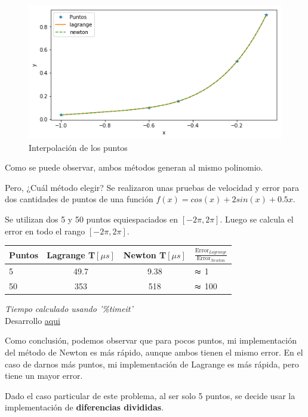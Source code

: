 \documentclass[spanish, fleqn]{article}
\begin{document}
\begin{enumerate}
   \begin{figure}[h]
    \caption{Interpolación de los puntos}
    \centering 
 	\includegraphics[scale=0.6]{interpolacion1.png}
   \end{figure}
  
	Como se puede observar, ambos métodos generan al mismo polinomio.
	
	Pero, ¿Cuál método elegir?
	Se realizaron unas pruebas de velocidad y error para dos cantidades de puntos de una función $f(x) = cos(x) + 2 sin(x) + 0.5x$.
	
	Se utilizan dos 5 y 50 puntos equiespaciados en $[-2\pi, 2\pi]$. Luego se calcula el error en todo el rango $[-2\pi, 2\pi]$.
		\begin{center}
	\begin{tabular}{|l|c|c|l|}
	\hline
	Puntos & Lagrange T$[\mu s]$& Newton T$[\mu s]$& $\frac{\text{Error}_{Lagrange}}{\text{Error}_{Newton}}$\\
	\hline
	5	& 49.7 & 9.38 & $\thickapprox$ 1\\
	\hline
	50 & 353 & 518 & $\thickapprox$ 100\\
	\hline
	\end{tabular}
	

	\small{\textit{Tiempo calculado usando '\%timeit'}\\ Desarrollo \href{https://github.com/sborquez/INF-221-2018-1-/blob/master/Tarea1/codigos/tarea1Sandbox.ipynb}{aqui}}
	\end{center}
  
  
  Como conclusión, podemos observar que para pocos puntos, mi implementación del método de Newton es más rápido, aunque ambos tienen el mismo error. En el caso de darnos más puntos, mi implementación de Lagrange es más rápida, pero tiene un mayor error.
  
  Dado el caso particular de este problema, al ser solo 5 puntos, se decide usar la implementación de \textbf{diferencias divididas}.
  

\end{enumerate}
\end{document}
